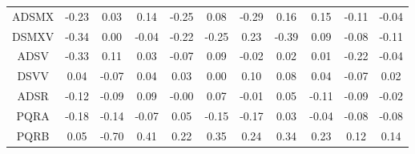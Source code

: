 \documentclass[11pt,a4paper]{report}
\begin{document}
\begin{longtable}{ | c || c | c | c | c | c | c | c | c | c || c |}
ADSMX &  \cellcolor[HTML]{FFF7F7} -0.23 &  \cellcolor[HTML]{FFFFFF} 0.03 &  \cellcolor[HTML]{FFFFFF} 0.14 &  \cellcolor[HTML]{FFF7F7} -0.25 &  \cellcolor[HTML]{FFFFFF} 0.08 &  \cellcolor[HTML]{FFF7F7} -0.29 &  \cellcolor[HTML]{F7F7FF} 0.16 &  \cellcolor[HTML]{FFFFFF} 0.15 &  \cellcolor[HTML]{FFFFFF} -0.11 &  \cellcolor[HTML]{FFFFFF} -0.04 \\
DSMXV &  \cellcolor[HTML]{FFF7F7} -0.34 &  \cellcolor[HTML]{FFFFFF} 0.00 &  \cellcolor[HTML]{FFFFFF} -0.04 &  \cellcolor[HTML]{FFF7F7} -0.22 &  \cellcolor[HTML]{FFF7F7} -0.25 &  \cellcolor[HTML]{F7F7FF} 0.23 &  \cellcolor[HTML]{FFF7F7} -0.39 &  \cellcolor[HTML]{FFFFFF} 0.09 &  \cellcolor[HTML]{FFFFFF} -0.08 &  \cellcolor[HTML]{FFFFFF} -0.11 \\
ADSV &  \cellcolor[HTML]{FFF7F7} -0.33 &  \cellcolor[HTML]{FFFFFF} 0.11 &  \cellcolor[HTML]{FFFFFF} 0.03 &  \cellcolor[HTML]{FFFFFF} -0.07 &  \cellcolor[HTML]{FFFFFF} 0.09 &  \cellcolor[HTML]{FFFFFF} -0.02 &  \cellcolor[HTML]{FFFFFF} 0.02 &  \cellcolor[HTML]{FFFFFF} 0.01 &  \cellcolor[HTML]{FFF7F7} -0.22 &  \cellcolor[HTML]{FFFFFF} -0.04 \\
DSVV &  \cellcolor[HTML]{FFFFFF} 0.04 &  \cellcolor[HTML]{FFFFFF} -0.07 &  \cellcolor[HTML]{FFFFFF} 0.04 &  \cellcolor[HTML]{FFFFFF} 0.03 &  \cellcolor[HTML]{FFFFFF} 0.00 &  \cellcolor[HTML]{FFFFFF} 0.10 &  \cellcolor[HTML]{FFFFFF} 0.08 &  \cellcolor[HTML]{FFFFFF} 0.04 &  \cellcolor[HTML]{FFFFFF} -0.07 &  \cellcolor[HTML]{FFFFFF} 0.02 \\
ADSR &  \cellcolor[HTML]{FFFFFF} -0.12 &  \cellcolor[HTML]{FFFFFF} -0.09 &  \cellcolor[HTML]{FFFFFF} 0.09 &  \cellcolor[HTML]{FFFFFF} -0.00 &  \cellcolor[HTML]{FFFFFF} 0.07 &  \cellcolor[HTML]{FFFFFF} -0.01 &  \cellcolor[HTML]{FFFFFF} 0.05 &  \cellcolor[HTML]{FFFFFF} -0.11 &  \cellcolor[HTML]{FFFFFF} -0.09 &  \cellcolor[HTML]{FFFFFF} -0.02 \\
PQRA &  \cellcolor[HTML]{FFF7F7} -0.18 &  \cellcolor[HTML]{FFFFFF} -0.14 &  \cellcolor[HTML]{FFFFFF} -0.07 &  \cellcolor[HTML]{FFFFFF} 0.05 &  \cellcolor[HTML]{FFFFFF} -0.15 &  \cellcolor[HTML]{FFF7F7} -0.17 &  \cellcolor[HTML]{FFFFFF} 0.03 &  \cellcolor[HTML]{FFFFFF} -0.04 &  \cellcolor[HTML]{FFFFFF} -0.08 &  \cellcolor[HTML]{FFFFFF} -0.08 \\
PQRB &  \cellcolor[HTML]{FFFFFF} 0.05 &  \cellcolor[HTML]{FFEFEF} -0.70 &  \cellcolor[HTML]{F7F7FF} 0.41 &  \cellcolor[HTML]{F7F7FF} 0.22 &  \cellcolor[HTML]{F7F7FF} 0.35 &  \cellcolor[HTML]{F7F7FF} 0.24 &  \cellcolor[HTML]{F7F7FF} 0.34 &  \cellcolor[HTML]{F7F7FF} 0.23 &  \cellcolor[HTML]{FFFFFF} 0.12 &  \cellcolor[HTML]{FFFFFF} 0.14 \\

\end{longtable}
\end{document}
